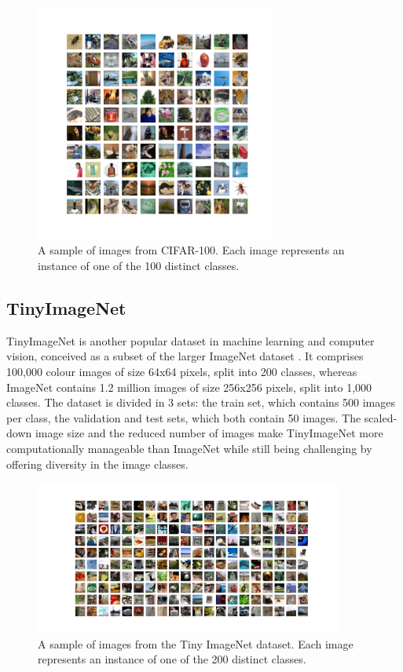 \begin{figure}[htbp]
  \centering
  \includegraphics[width=0.7\textwidth]{chapter_dlo/assets/cifar-100_example.png}
  \caption{A sample of images from CIFAR-100. Each image represents an instance
    of one of the 100 distinct classes.}
  \label{fig:intro:cifar100_examples}
\end{figure}


\subsection{TinyImageNet}

TinyImageNet is another popular dataset in machine learning and computer vision,
conceived as a subset of the larger ImageNet dataset
\cite{DBLP:journals/ijcv/RussakovskyDSKS15}. It comprises 100,000 colour images
of size 64x64 pixels, split into 200 classes, whereas ImageNet contains 1.2
million images of size 256x256 pixels, split into 1,000 classes. The dataset is
divided in 3 sets: the train set, which contains 500 images per class, the
validation and test sets, which both contain 50 images. The scaled-down image
size and the reduced number of images make TinyImageNet more computationally
manageable than ImageNet while still being challenging by offering diversity in
the image classes.\\


\begin{figure}[htbp]
  \centering
  \includegraphics[width=0.9\textwidth]{chapter_dlo/assets/tinyimagenet_example.png}
  \caption{A sample of images from the Tiny ImageNet dataset. Each image
    represents an instance of one of the  200 distinct classes.}
  \label{fig:intro:tinyimagenet_examples}
\end{figure}

